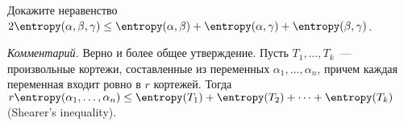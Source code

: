Докажите неравенство $2 \entropy(\alpha, \beta, \gamma) \le \entropy(\alpha, \beta) + \entropy(\alpha, \gamma) 
+ \entropy(\beta, \gamma)$.

\textit{Комментарий.} Верно и более общее утверждение. Пусть $T_1, \dots, T_k$~--- произвольные кортежи,
составленные из переменных $\alpha_1, \dots, \alpha_n$, причем каждая переменная входит ровно в $r$
кортежей. Тогда $r \entropy(\alpha_1, \dots, \alpha_n) \leq \entropy(T_1) + \entropy(T_2) + \dots +
\entropy(T_k)$ (Shearer's inequality).
